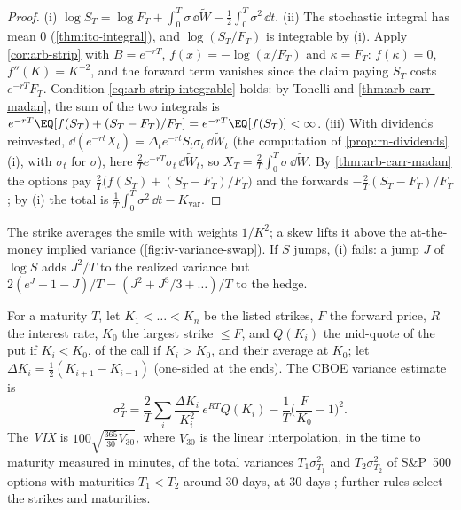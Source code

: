 \begin{proof}
(i) $\log S_T=\log F_T+\int_0^T\sigma\,\dd\widetilde W-\frac12\int_0^T\sigma^2\,\dd t$. (ii) The stochastic
integral has mean $0$ (\cref{thm:ito-integral}), and $\log(S_T/F_T)$ is integrable by (i). Apply \cref{cor:arb-strip} with $B=e^{-rT}$, $f(x)=-\log(x/F_T)$ and $\kappa=F_T$: $f(\kappa)=0$,
$f''(K)=K^{-2}$, and the forward term vanishes since the claim paying $S_T$ costs $e^{-rT}F_T$.
Condition \eqref{eq:arb-strip-integrable} holds: by Tonelli and \cref{thm:arb-carr-madan}, the sum of
the two integrals is $e^{-rT}\EQ[f(S_T)+(S_T-F_T)/F_T]=e^{-rT}\EQ[f(S_T)]<\infty$.
(iii) With dividends reinvested, $\dd(e^{-rt}X_t)=\Delta_te^{-rt}S_t\sigma_t\,\dd\widetilde W_t$
(the computation of \cref{prop:rn-dividends}(i), with $\sigma_t$ for $\sigma$), here $\frac2Te^{-rT}\sigma_t\,\dd\widetilde W_t$, so
$X_T=\frac2T\int_0^T\sigma\,\dd\widetilde W$. By \cref{thm:arb-carr-madan} the options pay
$\frac2T\big(f(S_T)+(S_T-F_T)/F_T\big)$ and the forwards $-\frac2T(S_T-F_T)/F_T$; by (i) the total is
$\frac1T\int_0^T\sigma^2\,\dd t-K_{\mathrm{var}}$.
\end{proof}

The strike averages the smile with weights $1/K^2$; a skew lifts it above the at-the-money implied
variance (\cref{fig:iv-variance-swap}). If $S$ jumps, (i) fails: a jump $J$ of $\log S$ adds $J^2/T$ to the
realized variance but $2(e^J-1-J)/T=(J^2+J^3/3+\dots)/T$ to the hedge.

\begin{definition}\label{def:iv-vix}
For a maturity $T$, let $K_1<\dots<K_n$ be the listed strikes, $F$ the forward price, $R$ the interest
rate, $K_0$ the largest strike $\le F$, and $Q(K_i)$ the mid-quote of the put if $K_i<K_0$, of the call if
$K_i>K_0$, and their average at $K_0$; let $\Delta K_i=\frac12(K_{i+1}-K_{i-1})$ (one-sided at the ends).
The CBOE variance estimate is
\begin{equation}\label{eq:iv-vix}
  \sigma^2_T=\frac2T\sum_i\frac{\Delta K_i}{K_i^2}\,e^{RT}Q(K_i)-\frac1T\Big(\frac F{K_0}-1\Big)^2 .
\end{equation}
The \emph{VIX} is $100\sqrt{\frac{365}{30}V_{30}}$, where $V_{30}$ is the linear interpolation, in the time
to maturity measured in minutes, of the total variances $T_1\sigma^2_{T_1}$ and $T_2\sigma^2_{T_2}$ of S\&P~500
options with maturities $T_1<T_2$ around $30$ days, at $30$ days \citep{cboe-vix}; further rules select
the strikes and maturities.
\end{definition}


